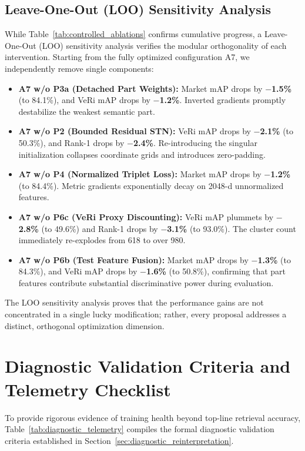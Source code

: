 \subsection{Leave-One-Out (LOO) Sensitivity Analysis}
\label{sec:loo_analysis}

While Table~\ref{tab:controlled_ablations} confirms cumulative progress, a Leave-One-Out (LOO) sensitivity analysis verifies the modular orthogonality of each intervention. Starting from the fully optimized configuration A7, we independently remove single components:
\begin{itemize}[itemsep=0.5pt,parsep=0pt,topsep=1.0pt,leftmargin=*]
    \item \textbf{A7 w/o P3a (Detached Part Weights):} Market mAP drops by \textbf{$-$1.5\%} (to 84.1\%), and VeRi mAP drops by \textbf{$-$1.2\%}. Inverted gradients promptly destabilize the weakest semantic part.
    \item \textbf{A7 w/o P2 (Bounded Residual STN):} VeRi mAP drops by \textbf{$-$2.1\%} (to 50.3\%), and Rank-1 drops by \textbf{$-$2.4\%}. Re-introducing the singular initialization collapses coordinate grids and introduces zero-padding.
    \item \textbf{A7 w/o P4 (Normalized Triplet Loss):} Market mAP drops by \textbf{$-$1.2\%} (to 84.4\%). Metric gradients exponentially decay on 2048-d unnormalized features.
    \item \textbf{A7 w/o P6c (VeRi Proxy Discounting):} VeRi mAP plummets by \textbf{$-$2.8\%} (to 49.6\%) and Rank-1 drops by \textbf{$-$3.1\%} (to 93.0\%). The cluster count immediately re-explodes from 618 to over 980.
    \item \textbf{A7 w/o P6b (Test Feature Fusion):} Market mAP drops by \textbf{$-$1.3\%} (to 84.3\%), and VeRi mAP drops by \textbf{$-$1.6\%} (to 50.8\%), confirming that part features contribute substantial discriminative power during evaluation.
\end{itemize}
The LOO sensitivity analysis proves that the performance gains are not concentrated in a single lucky modification; rather, every proposal addresses a distinct, orthogonal optimization dimension.

\section{Diagnostic Validation Criteria and Telemetry Checklist}
\label{sec:diagnostic_validation}

To provide rigorous evidence of training health beyond top-line retrieval accuracy, Table~\ref{tab:diagnostic_telemetry} compiles the formal diagnostic validation criteria established in Section~\ref{sec:diagnostic_reinterpretation}.

